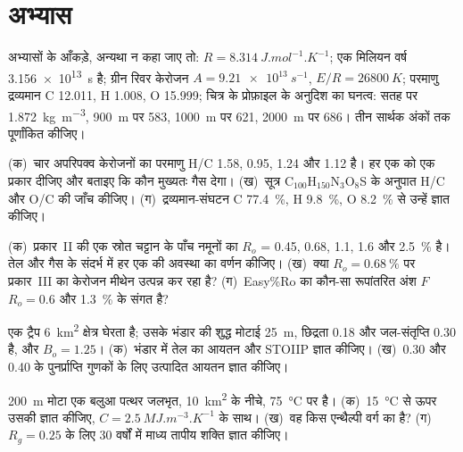 \section*{अभ्यास}\label{sec:b2:energy-geology:exercises}

अभ्यासों के आँकड़े, अन्यथा न कहा जाए तो: $R = \qty{8.314}{J.mol^{-1}.K^{-1}}$; एक मिलियन
वर्ष \qty{3.156e13}{s} है; ग्रीन रिवर केरोजन $A = \qty{9.21e13}{s^{-1}}$, $E/R = \qty{26800}{K}$;
परमाणु द्रव्यमान C 12.011, H 1.008, O 15.999; चित्र के प्रोफ़ाइल के अनुदिश  का घनत्व:
सतह पर \qty{1.872}{kg.m^{-3}}, \qty{900}{m} पर 583, \qty{1000}{m} पर 621, \qty{2000}{m} पर
686। तीन सार्थक अंकों तक पूर्णांकित कीजिए।

\begin{exercise}[$\star$]\label{exo:b2:energy-geology:1}
(क)~चार अपरिपक्व केरोजनों का परमाणु H/C 1.58, 0.95, 1.24 और 1.12 है। हर एक को एक प्रकार दीजिए और बताइए
कि कौन मुख्यतः गैस देगा। (ख)~सूत्र C$_{100}$H$_{150}$N$_3$O$_8$S के अनुपात H/C और O/C
की जाँच कीजिए। (ग)~द्रव्यमान-संघटन C \qty{77.4}{\percent}, H
\qty{9.8}{\percent}, O \qty{8.2}{\percent} से उन्हें ज्ञात कीजिए।
\end{exercise}

\begin{exercise}[$\star$]\label{exo:b2:energy-geology:2}
(क)~प्रकार~II की एक स्रोत चट्टान के पाँच नमूनों का $R_o$ = 0.45, 0.68, 1.1, 1.6 और \qty{2.5}{\percent} है।
तेल और गैस के संदर्भ में हर एक की अवस्था का वर्णन कीजिए। (ख)~क्या $R_o =
\qty{0.68}{\percent}$ पर प्रकार~III का केरोजन मीथेन उत्पन्न कर रहा है? (ग)~Easy\%Ro का कौन-सा रूपांतरित अंश $F$
$R_o = 0.6$ और \qty{1.3}{\percent} के संगत है?
\end{exercise}

\begin{exercise}[$\star$]\label{exo:b2:energy-geology:3}
एक ट्रैप \qty{6}{km^2} क्षेत्र घेरता है; उसके भंडार की शुद्ध मोटाई \qty{25}{m}, छिद्रता 0.18 और जल-संतृप्ति
0.30 है, और $B_o = 1.25$। (क)~भंडार में तेल का आयतन और STOIIP ज्ञात कीजिए। (ख)~0.30 और 0.40 के
पुनर्प्राप्ति गुणकों के लिए उत्पादित आयतन ज्ञात कीजिए।
\end{exercise}

\begin{exercise}[$\star$]\label{exo:b2:energy-geology:4}
\qty{200}{m} मोटा एक बलुआ पत्थर जलभृत, \qty{10}{km^2} के नीचे, \qty{75}{\celsius} पर है। (क)~\qty{15}{\celsius} से ऊपर
उसकी  ज्ञात कीजिए, $C = \qty{2.5}{MJ.m^{-3}.K^{-1}}$ के साथ। (ख)~वह किस
एन्थैल्पी वर्ग का है? (ग)~$R_g = 0.25$ के लिए 30 वर्षों में माध्य तापीय शक्ति ज्ञात कीजिए।
\end{exercise}

